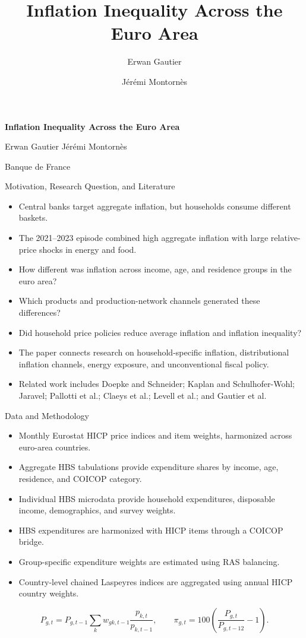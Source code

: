 \documentclass[10pt,aspectratio=169]{beamer}
\title{Inflation Inequality Across the Euro Area}
\author{Erwan Gautier \and J\'er\'emi Montorn\`es}
\institute{Banque de France}
\date{}
\begin{document}
\begin{frame}[plain]
  \centering
  \vspace{0.20\textheight}
  {\LARGE\bfseries Inflation Inequality Across the Euro Area\par}
  \vspace{1.2em}
  {\large Erwan Gautier \qquad J\'er\'emi Montorn\`es\par}
  \vspace{0.6em}
  {\normalsize Banque de France\par}
\end{frame}

\begin{frame}{Motivation, Research Question, and Literature}
\begin{itemize}
  \item Central banks target aggregate inflation, but households consume different baskets.
  \item The 2021--2023 episode combined high aggregate inflation with large relative-price shocks in energy and food.
  \item How different was inflation across income, age, and residence groups in the euro area?
  \item Which products and production-network channels generated these differences?
  \item Did household price policies reduce average inflation and inflation inequality?
  \item The paper connects research on household-specific inflation, distributional inflation channels, energy exposure, and unconventional fiscal policy.
  \item Related work includes Doepke and Schneider; Kaplan and Schulhofer-Wohl; Jaravel; Pallotti et al.; Claeys et al.; Levell et al.; and Gautier et al.
\end{itemize}
\end{frame}

\begin{frame}{Data and Methodology}
\begin{itemize}
  \item Monthly Eurostat HICP price indices and item weights, harmonized across euro-area countries.
  \item Aggregate HBS tabulations provide expenditure shares by income, age, residence, and COICOP category.
  \item Individual HBS microdata provide household expenditures, disposable income, demographics, and survey weights.
  \item HBS expenditures are harmonized with HICP items through a COICOP bridge.
  \item Group-specific expenditure weights are estimated using RAS balancing.
  \item Country-level chained Laspeyres indices are aggregated using annual HICP country weights.
\end{itemize}
\[
P_{g,t}=P_{g,t-1}\sum_k w_{gk,t-1}\frac{p_{k,t}}{p_{k,t-1}},
\qquad
\pi_{g,t}=100\left(\frac{P_{g,t}}{P_{g,t-12}}-1\right).
\]
\end{frame}
\end{document}
